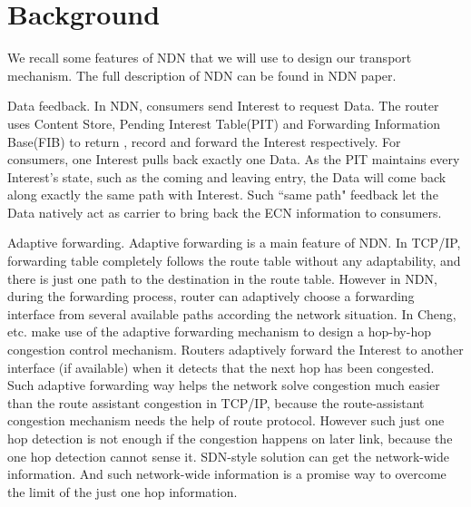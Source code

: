 
\section{Background}
We recall some features of NDN that we will use to design our transport mechanism. The full description of NDN can be found in NDN paper\cite{NDN}\cite{Adaptive}.

Data feedback. In NDN, consumers send Interest to request Data. The router uses Content Store, Pending Interest Table(PIT) and Forwarding Information Base(FIB) to return , record and forward the Interest respectively. For consumers, one Interest pulls back exactly one Data. As the PIT maintains every Interest's state, such as the coming and leaving entry, the Data will come back along exactly the same path with Interest. Such ``same path" feedback let the Data natively act as carrier to bring back the ECN information to consumers.

Adaptive forwarding. Adaptive forwarding is a main feature of NDN. In TCP/IP, forwarding table completely follows the route table without any adaptability, and there is just one path to the destination in the route table. However in NDN, during the forwarding process, router can adaptively choose a forwarding interface from several available paths according the network situation. In \cite{Adaptive} Cheng, etc. make use of the adaptive forwarding mechanism to design a hop-by-hop congestion control mechanism. Routers adaptively forward the Interest to another interface (if available) when it detects that the next hop has been congested. Such adaptive forwarding way helps the network solve congestion much easier than the route assistant congestion in TCP/IP, because the route-assistant congestion mechanism needs the help of route protocol\cite{selfish}. However such just one hop detection is not enough if the congestion happens on later link, because the one hop detection cannot sense it.  SDN-style solution can get the network-wide information\cite{SDN}. And such network-wide information is a promise way to overcome the limit of the just one hop information.
